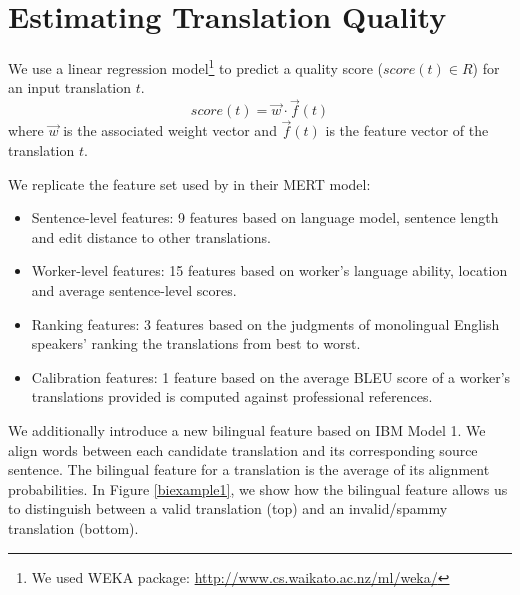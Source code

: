 \documentclass[11pt,letterpaper]{article}
\begin{document}
\section{Estimating Translation Quality}
We use a linear regression model\footnote{We used WEKA package: \url{http://www.cs.waikato.ac.nz/ml/weka/}} to predict a quality score ($ score(t) \in R$) for an input translation $t$.
\[ score(t) = \vec{w}  \cdot \vec f(t) \]
  where $\vec{w}$ is the associated weight vector and $\vec f(t)$ is the feature vector of the translation $t$. 

We replicate the feature set used by  in their MERT model:

\begin{itemize}
\setlength\itemsep{0em}
\item  Sentence-level features: 9 features based on language model, sentence length and edit distance to other translations. 
\item Worker-level features: 15 features based on worker's language ability, location and average sentence-level scores.
\item Ranking features: 3 features based on the judgments of monolingual English speakers' ranking the translations from best to worst.
\item Calibration features: 1 feature based on the average BLEU score of a worker's translations provided is computed against professional references.
\end{itemize}


We additionally introduce a new bilingual feature based on IBM Model 1. We align words between each candidate translation and its corresponding source sentence. The bilingual feature for a translation is the average of its alignment probabilities. In Figure \ref{biexample1}, we show how the bilingual feature allows us to distinguish between a valid translation (top) and an invalid/spammy translation (bottom).
\end{document}
